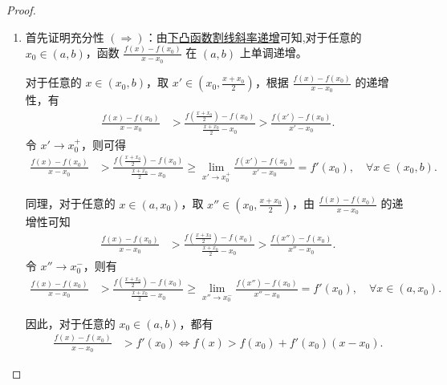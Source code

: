 \documentclass[../../main.tex]{subfiles}%
\begin{document}
\begin{proof}
\begin{enumerate}
\begin{enumerate}[(1)]
接下来证明必要性 $(\Leftarrow)$：由已知条件可知，对于任意的 $x_1,x_2,x_3\in I$ 且 $x_1 < x_2 < x_3$，都有
\begin{align*}
f(x_1) \geqslant f'(x_2)(x_1 - x_2) + f(x_2),\quad f(x_3) \geqslant f'(x_2)(x_3 - x_2) + f(x_2).
\end{align*}
由此可以推出
\begin{align*}
\frac{f(x_2) - f(x_1)}{x_2 - x_1} \leqslant f'(x_2) \leqslant \frac{f(x_3) - f(x_2)}{x_3 - x_2}.
\end{align*}
所以，由\hyperref[下凸函数割线斜率递增]{下凸函数割线斜率递增}可知 $f$ 在 $I$ 上下凸.

\item 首先证明充分性 $(\Rightarrow)$：由\hyperref[下凸函数割线斜率递增]{下凸函数割线斜率递增}可知,对于任意的 $x_0\in (a,b)$，函数 $\frac{f(x) - f(x_0)}{x - x_0}$ 在 $(a,b)$ 上单调递增。

对于任意的 $x\in (x_0,b)$，取 $x'\in \left(x_0,\frac{x + x_0}{2}\right)$，根据 $\frac{f(x) - f(x_0)}{x - x_0}$ 的递增性，有
\begin{align*}
\frac{f(x) - f(x_0)}{x - x_0} &> \frac{f\left(\frac{x + x_0}{2}\right) - f(x_0)}{\frac{x + x_0}{2} - x_0} > \frac{f(x') - f(x_0)}{x' - x_0}.
\end{align*}
令 $x'\to x_0^+$，则可得
\begin{align*}
\frac{f(x) - f(x_0)}{x - x_0} &> \frac{f\left(\frac{x + x_0}{2}\right) - f(x_0)}{\frac{x + x_0}{2} - x_0} \geqslant \lim_{x'\to x_0^+}\frac{f(x') - f(x_0)}{x' - x_0}=f'(x_0),\quad \forall x\in (x_0,b).
\end{align*}

同理，对于任意的 $x\in (a,x_0)$，取 $x''\in \left(x_0,\frac{x + x_0}{2}\right)$，由 $\frac{f(x) - f(x_0)}{x - x_0}$ 的递增性可知
\begin{align*}
\frac{f(x) - f(x_0)}{x - x_0} &> \frac{f\left(\frac{x + x_0}{2}\right) - f(x_0)}{\frac{x + x_0}{2} - x_0} > \frac{f(x'') - f(x_0)}{x'' - x_0}.
\end{align*}
令 $x''\to x_0^-$，则有
\begin{align*}
\frac{f(x) - f(x_0)}{x - x_0} &> \frac{f\left(\frac{x + x_0}{2}\right) - f(x_0)}{\frac{x + x_0}{2} - x_0} \geqslant \lim_{x''\to x_0^-}\frac{f(x'') - f(x_0)}{x'' - x_0}=f'(x_0),\quad \forall x\in (a,x_0).
\end{align*}

因此，对于任意的 $x_0\in (a,b)$，都有
\begin{align*}
\frac{f(x) - f(x_0)}{x - x_0} &> f'(x_0) \Leftrightarrow f(x)>f(x_0)+f'(x_0)(x - x_0).
\end{align*}


\end{enumerate}
\end{enumerate}
\end{proof}
\end{document}
